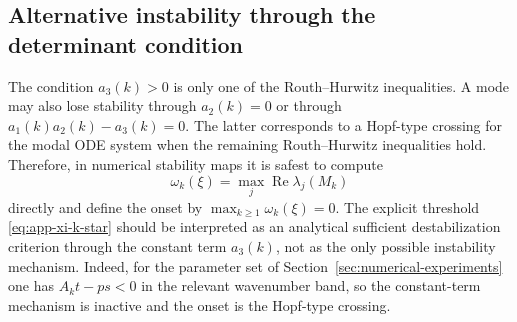 \documentclass[a4paper,fleqn,longmktitle]{cas-sc}
\theoremstyle{plain}
\theoremstyle{definition}
\numberwithin{equation}{section}
\begin{document}
\subsection{Alternative instability through the determinant condition}
\label{app:rh-other-instabilities}
The condition \(a_3(k)>0\) is only one of the Routh--Hurwitz inequalities.
A mode may also lose stability through \(a_2(k)=0\) or through
\(a_1(k)a_2(k)-a_3(k)=0\). The latter corresponds to a Hopf-type crossing for the
modal ODE system when the remaining Routh--Hurwitz inequalities hold. Therefore,
in numerical stability maps it is safest to compute
\[
\omega_k(\xi)
=
\max_j\operatorname{Re}\lambda_j(M_k)
\]
directly and define the onset by \(\max_{k\ge1}\omega_k(\xi)=0\). The explicit
threshold \eqref{eq:app-xi-k-star} should be interpreted as an analytical
sufficient destabilization criterion through the constant term \(a_3(k)\), not as
the only possible instability mechanism. Indeed, for the parameter set of
Section~\ref{sec:numerical-experiments} one has \(A_kt-ps<0\) in the relevant
wavenumber band, so the constant-term mechanism is inactive and the onset is the
Hopf-type crossing.



\end{document}

